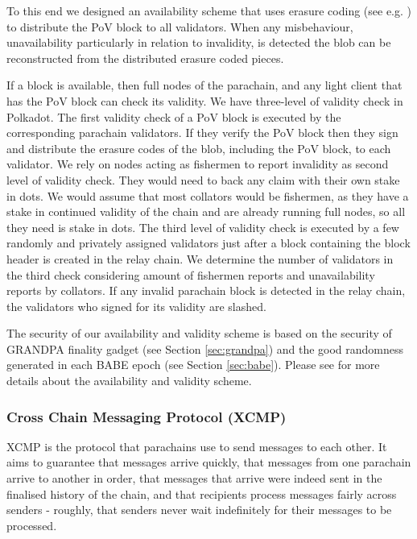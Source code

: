 To this end we designed an availability scheme that uses erasure coding (see e.g. \cite{availabilityETH2}) to distribute the PoV block to all validators.
When any misbehaviour, unavailability particularly in relation to invalidity, is detected the blob can be reconstructed from the distributed erasure coded pieces.

If a block is available, then full nodes of the parachain, and any light client that has the PoV block can check its validity. We have three-level of validity check in Polkadot. The first validity check of a PoV block is executed by the corresponding parachain validators. If they verify the PoV block then they sign and distribute the erasure codes of the blob, including the PoV block, to each validator.
We rely on nodes acting as fishermen to report invalidity as second level of validity check. They would need to back any claim with their own stake in dots. We would assume that most collators would be fishermen, as they have a stake in continued validity of the chain and are already running full nodes, so all they need is stake in dots. The third level of validity check is executed by a few randomly and privately assigned validators just after a block containing the block header is created in the relay chain. We determine the number of validators in the third check considering amount of fishermen reports and unavailability reports by collators. If  any invalid parachain block is detected in the relay chain, the validators who signed for its validity are slashed.

The security of our availability and validity scheme is based on the security of GRANDPA finality gadget (see Section \ref{sec:grandpa}) and the good randomness generated in each BABE epoch (see Section \ref{sec:babe}). Please see \cite{availandvalid} for more details about the availability and validity scheme.


\subsubsection{Cross Chain Messaging Protocol (XCMP)} \label{sec:XCMP}
XCMP is the protocol that parachains use to send messages to each other. It aims to guarantee that messages arrive quickly, that messages from one parachain arrive to another in order,
that messages that arrive were indeed sent in the finalised history of the chain,
and that recipients process messages fairly across senders - roughly, that senders never wait indefinitely for their messages to be processed.

